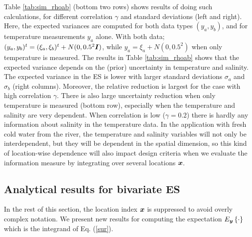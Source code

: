 \documentclass[aoas]{imsart}
\begin{document}
Table \ref{tab:sim_rhoab} (bottom two rows) shows results of doing such calculations, for different correlation $\gamma$ and standard deviations (left and right). Here, the expected variances are computed for both data types $(y_a,y_b)$, and for temperature measurements $y_a$ alone. With both data; $(y_a,y_b)^t=(\xi_a,\xi_b)^t+N(0,0.5^2{\boldsymbol I})$, while $y_a=\xi_a+N(0,0.5^2)$ when only temperature is measured.
The results in Table \ref{tab:sim_rhoab} shows that 
the expected variance depends on the (prior) uncertainty in temperature and salinity. The expected variance in the ES is lower with larger standard deviations $\sigma_a$ and $\sigma_b$ (right columns). Moreover, the relative reduction is largest for the case with high correlation $\gamma$. There is also large uncertainty reduction when only temperature is measured (bottom row), especially when the temperature and salinity are very dependent. When correlation is low ($\gamma=0.2$) there is hardly any information about salinity in the temperature data. In the application with fresh cold water from the river, the temperature and salinity variables will not only be interdependent, but they will be dependent in the spatial dimension, so this kind of location-wise dependence will also impact design criteria when we evaluate the information measure by integrating over several locations ${\boldsymbol x}$. 

\subsection{Analytical results for bivariate ES}

In the rest of this section, the location index ${\boldsymbol x}$ is suppressed to avoid overly complex notation. We present new results for computing the expectation $E_{{\boldsymbol y}}\left\{ \cdot \right\}$ which is the integrand of Eq. (\ref{sur}).
\end{document}
